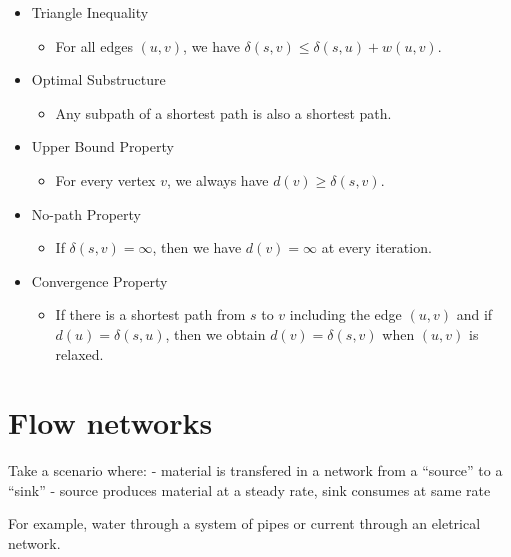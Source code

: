 \documentclass[11pt]{article}
\providecommand{\tightlist}{%
      \setlength{\itemsep}{0pt}\setlength{\parskip}{0pt}}
\begin{document}
\begin{itemize}
\tightlist
\item
  Triangle Inequality

  \begin{itemize}
  \tightlist
  \item
    For all edges \((u, v)\), we have
    \(\delta(s, v) \leq \delta(s, u) + w(u, v)\).
  \end{itemize}
\item
  Optimal Substructure

  \begin{itemize}
  \tightlist
  \item
    Any subpath of a shortest path is also a shortest path.
  \end{itemize}
\item
  Upper Bound Property

  \begin{itemize}
  \tightlist
  \item
    For every vertex \(v\), we always have \(d(v) \geq \delta(s, v)\).
  \end{itemize}
\item
  No-path Property

  \begin{itemize}
  \tightlist
  \item
    If \(\delta(s, v) = \infty\), then we have \(d(v) = \infty\) at
    every iteration.
  \end{itemize}
\item
  Convergence Property

  \begin{itemize}
  \tightlist
  \item
    If there is a shortest path from \(s\) to \(v\) including the edge
    \((u, v)\) and if \(d(u) = \delta(s, u)\), then we obtain
    \(d(v) = \delta(s, v)\) when \((u, v)\) is relaxed.
  \end{itemize}
\end{itemize}

    \section{Flow networks}\label{flow-networks}

Take a scenario where: - material is transfered in a network from a
``source'' to a ``sink'' - source produces material at a steady rate,
sink consumes at same rate

For example, water through a system of pipes or current through an
eletrical network.
\end{document}
